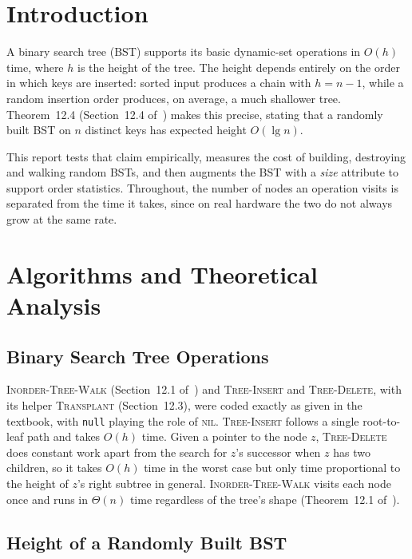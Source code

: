 \documentclass[conference]{IEEEtran}
\newcommand{\INS}{\textsc{Tree-Insert}}
\newcommand{\DEL}{\textsc{Tree-Delete}}
\newcommand{\WALK}{\textsc{Inorder-Tree-Walk}}
\newcommand{\TRANS}{\textsc{Transplant}}
\newcommand{\NIL}{\textsc{nil}}
\begin{document}
\section{Introduction}

A binary search tree (BST) supports its basic dynamic-set operations in $O(h)$
time, where $h$ is the height of the tree. The height depends entirely on the
order in which keys are inserted: sorted input produces a chain with
$h = n-1$, while a random insertion order produces, on average, a much shallower
tree. Theorem~12.4 (Section~12.4 of~\cite{clrs}) makes this precise, stating that a randomly
built BST on $n$ distinct keys has expected height $O(\lg n)$.

This report tests that claim empirically, measures the cost of building,
destroying and walking random BSTs, and then augments the BST with a
\emph{size} attribute to support order statistics. Throughout, the number of
nodes an operation visits is separated from the time it takes, since on real
hardware the two do not always grow at the same rate.

\section{Algorithms and Theoretical Analysis}

\subsection{Binary Search Tree Operations}

\WALK{} (Section~12.1 of~\cite{clrs}) and \INS{} and \DEL{}, with its
helper \TRANS{} (Section~12.3), were coded exactly as given in the textbook,
with \texttt{null} playing the role of
\NIL{}. \INS{} follows a single root-to-leaf path and takes $O(h)$ time. Given a
pointer to the node $z$, \DEL{} does constant work apart from the search for
$z$'s successor when $z$ has two children, so it takes $O(h)$ time in the
worst case but only time proportional to the height of $z$'s right subtree in
general. \WALK{} visits each node once and runs in $\Theta(n)$ time
regardless of the tree's shape (Theorem~12.1 of~\cite{clrs}).

\subsection{Height of a Randomly Built BST}
\end{document}
